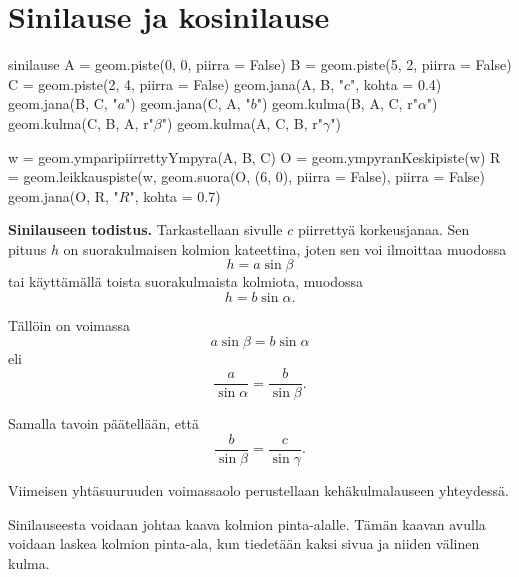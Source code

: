 \section*{Sinilause ja kosinilause}

\begin{luoKuva}{sinilause}
A = geom.piste(0, 0, piirra = False)
B = geom.piste(5, 2, piirra = False)
C = geom.piste(2, 4, piirra = False)
geom.jana(A, B, "$c$", kohta = 0.4)
geom.jana(B, C, "$a$")
geom.jana(C, A, "$b$")
geom.kulma(B, A, C, r"$\alpha$")
geom.kulma(C, B, A, r"$\beta$")
geom.kulma(A, C, B, r"$\gamma$")

w = geom.ymparipiirrettyYmpyra(A, B, C)
O = geom.ympyranKeskipiste(w)
R = geom.leikkauspiste(w, geom.suora(O, (6, 0), piirra = False), piirra = False)
geom.jana(O, R, "$R$", kohta = 0.7)
\end{luoKuva}


\textbf{Sinilauseen todistus.} Tarkastellaan sivulle $c$ piirrettyä korkeusjanaa.
Sen pituus $h$ on suorakulmaisen kolmion kateettina, joten sen voi ilmoittaa muodossa
\[
h = a \sin \beta
\]
tai käyttämällä toista suorakulmaista kolmiota, muodossa
\[
h = b \sin \alpha .
\]

Tällöin on voimassa
\[
a \sin \beta = b \sin \alpha
\]
eli
\[
\frac{a}{\sin \alpha} = \frac{b}{\sin \beta}.
\]

Samalla tavoin päätellään, että
\[
\frac{b}{\sin \beta} = \frac{c}{\sin \gamma}.
\]

Viimeisen yhtäsuuruuden voimassaolo perustellaan kehäkulmalauseen yhteydessä.

Sinilauseesta voidaan johtaa kaava kolmion pinta-alalle. Tämän kaavan avulla voidaan laskea kolmion pinta-ala, kun tiedetään kaksi sivua ja niiden välinen kulma.


